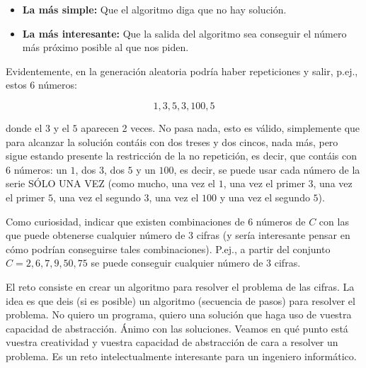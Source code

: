 \begin{itemize}
	\item\textbf{La más simple:} Que el algoritmo diga que no hay solución.
	\item\textbf{La más interesante:} Que la salida del algoritmo sea conseguir el número más próximo posible al que nos piden.
\end{itemize}

Evidentemente, en la generación aleatoria podría haber repeticiones y salir, p.ej., estos 6 números:

\begin{center}
\[1,3,5,3,100,5\]
\end{center}

donde el $3$ y el $5$ aparecen 2 veces.
No pasa nada, esto es válido, simplemente que para alcanzar la solución contáis con dos treses y dos cincos, nada más, pero sigue estando presente la restricción de la no repetición, es decir, que contáis con 6 números: un $1$, dos $3$, dos $5$ y un $100$, es decir, se puede usar cada número de la serie SÓLO UNA VEZ (como mucho, una vez el $1$, una vez el primer $3$, una vez el primer $5$, una vez el segundo $3$, una vez el $100$ y una vez el segundo $5$).

Como curiosidad, indicar que existen combinaciones de 6 números de $C$ con las que puede obtenerse cualquier número de 3 cifras (y sería interesante pensar en cómo podrían conseguirse tales combinaciones).
P.ej., a partir del conjunto $C={2,6,7,9,50,75}$ se puede conseguir cualquier número de 3 cifras.

El reto consiste en crear un algoritmo para resolver el problema de las cifras.
La idea es que deis (si es posible) un algoritmo (secuencia de pasos) para resolver el problema.
No quiero un programa, quiero una solución que haga uso de vuestra capacidad de abstracción.
Ánimo con las soluciones.
Veamos en qué punto está vuestra creatividad y vuestra capacidad de abstracción de cara a resolver un problema.
Es un reto intelectualmente interesante para un ingeniero informático.

